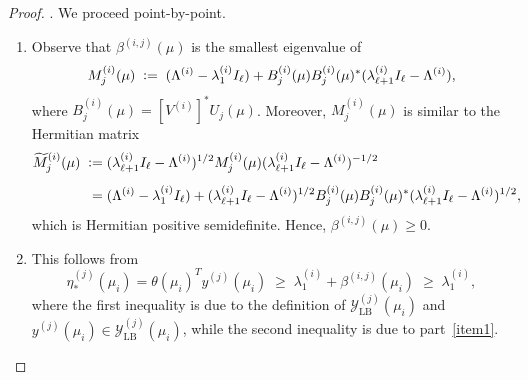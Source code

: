 \documentclass[10pt,a4paper]{amsart}
\begin{document}
\begin{proof}. We proceed point-by-point.
\begin{enumerate}
	\item 
	Observe that $\beta^{(i,j)}(\mu)$ is the smallest eigenvalue of
	\[
		M^{(i)}_j(\mu) \;\vcentcolon=\;
		(\Lambda^{(i)} - \lambda^{(i)}_1 I_\ell) +
		B^{(i)}_j(\mu) B^{(i)}_j(\mu)^\ast (\lambda^{(i)}_{\ell+1} I_\ell - \Lambda^{(i)}),
	\]
	where $B^{(i)}_j(\mu) = [V^{(i)}]^\ast U_j(\mu)$. Moreover, $M^{(i)}_j(\mu)$ is similar to the Hermitian matrix
	\begin{equation}\label{eq:def_tilM}
	\begin{split}
		\widetilde{M}^{(i)}_j(\mu) \;\vcentcolon=\; &
		(\lambda^{(i)}_{\ell+1} I_\ell - \Lambda^{(i)})^{1/2} 
			M^{(i)}_j(\mu)
		(\lambda^{(i)}_{\ell+1} I_\ell - \Lambda^{(i)})^{-1/2} \\[0.5em]
		= \; &
		(\Lambda^{(i)} - \lambda^{(i)}_1 I_\ell) + 
		(\lambda^{(i)}_{\ell+1} I_\ell - \Lambda^{(i)})^{1/2} 
		B^{(i)}_j(\mu) B^{(i)}_j(\mu)^\ast
		(\lambda^{(i)}_{\ell+1} I_\ell - \Lambda^{(i)})^{1/2},
	\end{split}
	\end{equation}
	which is Hermitian positive semidefinite. Hence, $\beta^{(i,j)}(\mu) \geq 0$.

	\item 
	This follows from
	\begin{equation}\label{eq:eta_vs_l1}
		\eta^{(j)}_\ast(\mu_i) = \theta(\mu_i)^T y^{(j)}(\mu_i) 
		\;\geq\; \lambda^{(i)}_1 + \beta^{(i,j)}(\mu_i)
		\;\geq\; \lambda^{(i)}_1,
	\end{equation}
	where the first inequality is due to the definition of $\mathcal{Y}^{(j)}_{\mathrm{LB}}(\mu_i)$
	and $y^{(j)}(\mu_i) \in \mathcal{Y}^{(j)}_{\mathrm{LB}}(\mu_i)$, while the second 
	inequality is due to part~\ref{item1}.


\end{enumerate}
\end{proof}
\end{document}
